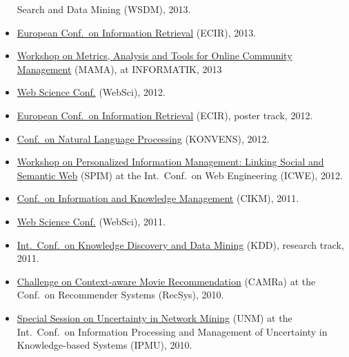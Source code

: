 \documentclass[line,margin]{res}
\begin{document}
\begin{resume}
\begin{itemize}
  Search and Data Mining (WSDM), 2013.  
\item \href{http://ecir2013.org/}{European Conf.\ on Information
  Retrieval} (ECIR), 2013.  
\item \href{http://mama.west.uni-koblenz.de/}{Workshop on Metrics,
  Analysis and Tools for Online Community Management} (MAMA), at
  INFORMATIK, 2013
\item \href{http://www.websci12.org/}{Web Science Conf.} (WebSci), 2012. 
\item \href{http://ecir2012.upf.edu/}{European Conf.\ on Information
  Retrieval} (ECIR), poster track, 2012.  
\item \href{http://www.oegai.at/konvens2012/}{Conf.\ on Natural Language
  Processing} (KONVENS), 2012. 
\item \href{http://spim-workshop.org/}{Workshop on Personalized
  Information Management: Linking Social and Semantic Web} (SPIM) at the
  Int.\ Conf.\ on Web Engineering (ICWE), 2012. 
\item \href{http://www.cikm2011.org/}{Conf.\ on Information and Knowledge
  Management} (CIKM), 2011.
\item \href{http://www.websci11.org/}{Web Science Conf.} (WebSci), 2011.
\item \href{http://www.sigkdd.org/kdd/2011/}{Int.\ Conf.\ on 
  Knowledge Discovery and Data Mining} (KDD), research track, 2011.
\item \href{http://www.dai-labor.de/camra2010/}{Challenge on
  Context-aware Movie Recommendation} (CAMRa) at the Conf.\ on  
  Recommender Systems (RecSys), 2010.   
\item \href{http://www.dai-labor.de/unm2010/}{Special Session on Uncertainty in Network Mining} (UNM) at the
  Int.\ Conf.\ on Information Processing and Management of
  Uncertainty in Knowledge-based Systems (IPMU), 2010. 
\end{itemize}


\end{resume}
\end{document}
